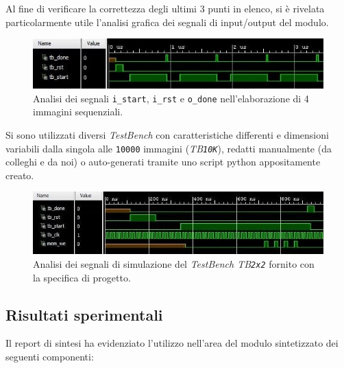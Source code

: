 \documentclass{article}
\begin{document}
Al fine di verificare la correttezza degli ultimi 3 punti in elenco, si è rivelata particolarmente utile l'analisi grafica dei segnali di input/output del modulo.
\vspace{0,2cm}

\begin{figure}[ht]
    \centering
    \includegraphics[scale=0.9]{segnaliSignificativi.jpg}
    \caption{Analisi dei segnali \texttt{i\_start}, \texttt{i\_rst} e \texttt{o\_done} nell'elaborazione di 4 immagini sequenziali.}
\end{figure}
\vspace{0,2cm}

Si sono utilizzati diversi \emph{TestBench} con caratteristiche differenti e dimensioni variabili dalla singola alle \texttt{10000} immagini (\emph{TB\texttt{10K}}), redatti manualmente (da colleghi e da noi) o auto-generati tramite uno script python appositamente creato.
\vspace{0,2cm}

\begin{figure}[ht]
    \centering
    \includegraphics[scale=0.8]{2x2.jpg}
    \caption{Analisi dei segnali di simulazione del \emph{TestBench TB\texttt{2x2}} fornito con la specifica di progetto.}
\end{figure}
\vspace{0,2cm}

\pagebreak

\subsection{Risultati sperimentali}
Il report di sintesi ha evidenziato l’utilizzo nell’area del modulo sintetizzato dei seguenti componenti:
\end{document}

